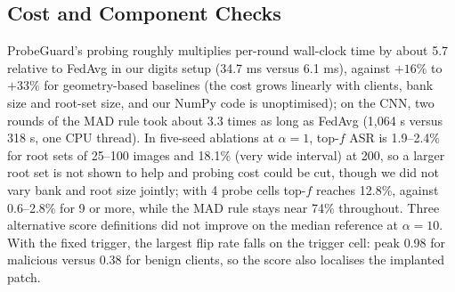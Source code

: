 \subsection{Cost and Component Checks}
ProbeGuard's probing roughly multiplies per-round wall-clock time by about 5.7 relative to FedAvg in our digits setup (34.7 ms versus 6.1 ms), against $+16\%$ to $+33\%$ for geometry-based baselines (the cost grows linearly with clients, bank size and root-set size, and our NumPy code is unoptimised); on the CNN, two rounds of the MAD rule took about 3.3 times as long as FedAvg (1,064 s versus 318 s, one CPU thread). In five-seed ablations at $\alpha=1$, top-$f$ ASR is 1.9--2.4\% for root sets of 25--100 images and 18.1\% (very wide interval) at 200, so a larger root set is not shown to help and probing cost could be cut, though we did not vary bank and root size jointly; with 4 probe cells top-$f$ reaches 12.8\%, against 0.6--2.8\% for 9 or more, while the MAD rule stays near 74\% throughout. Three alternative score definitions did not improve on the median reference at $\alpha=10$. With the fixed trigger, the largest flip rate falls on the trigger cell: peak 0.98 for malicious versus 0.38 for benign clients, so the score also localises the implanted patch.

